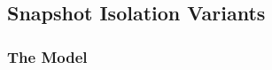 
\subsection{Snapshot Isolation Variants} \label{ss:si-variants}

\subsubsection{The \alloystar{} Model} \label{sss:si-alloystar}

\subsubsection{\taskchecking} \label{sss:si-taskchecking}

\subsubsection{\taskgenerating} \label{sss:si-taskgenerating}

\subsubsection{\taskcomparing} \label{sss:si-taskcomparing}

